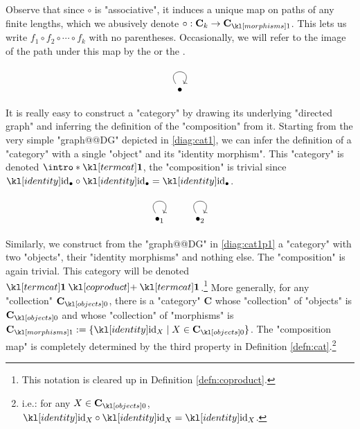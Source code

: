 \documentclass[main.tex]{subfiles}
\begin{document}
Observe that since $\circ$ is "associative", it induces a unique  map on paths of any finite lengths, which we abusively denote $\circ: \mathbf{C}_k \rightarrow \mor{\mathbf{C}}$. This lets us write $f_1 \circ f_2 \circ \cdots \circ f_k$ with no parentheses. \AP Occasionally, we will refer to the image of the path under this map by the  or the .
\begin{exmps}\label{exmp:simplecats}
	\begin{marginfigure}[5\baselineskip]\begin{equation}\label{diag:cat1}\begin{tikzcd}\bullet \arrow[loop, distance=2em, in=55, out=125]\end{tikzcd}\end{equation}\end{marginfigure} 
	It is really easy to construct a "category" by drawing its underlying "directed graph" and inferring the definition of the "composition" from it. Starting from the very simple "graph@@DG" depicted in \eqref{diag:cat1}, we can infer the definition of a "category" with a single "object" and its "identity morphism". \AP This "category" is denoted $\intro*\termcat$, the "composition" is trivial since $\id_{\bullet} \circ \id_{\bullet} = \id_{\bullet}$.

	\begin{marginfigure}[1\baselineskip]\begin{equation}\label{diag:cat1p1}\begin{tikzcd}\bullet_1 \arrow[loop, distance=2em, in=55, out=125]&\bullet_2 \arrow[loop, distance=2em, in=55, out=125]\end{tikzcd}\end{equation}\end{marginfigure}
	Similarly, we construct from the "graph@@DG" in \eqref{diag:cat1p1} a "category" with two "objects", their "identity morphisms" and nothing else. The "composition" is again trivial. This category will be denoted $\termcat \coproduct \termcat$.\footnote{This notation is cleared up in Definition \ref{defn:coproduct}.}
	More generally, for any "collection" $\obj{\mathbf{C}}$, there is a "category" $\mathbf{C}$ whose "collection" of "objects" is $\obj{\mathbf{C}}$ and whose "collection" of "morphisms" is $\mor{\mathbf{C}} := \{\id_X \mid X \in \obj{\mathbf{C}}\}$. The "composition map" is completely determined by the third property in Definition \ref{defn:cat}.\footnote{i.e.: for any $X \in \obj{\mathbf{C}}$, $\id_X \circ \id_X = \id_X$.}
	

\end{exmps}
\end{document}
